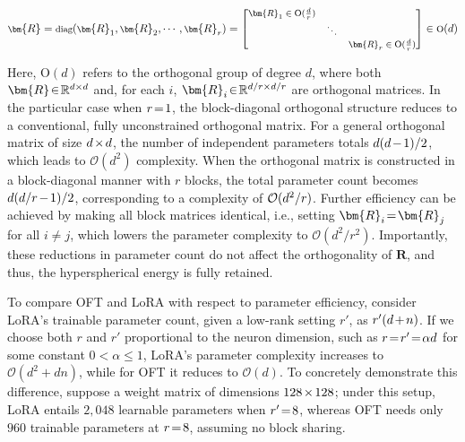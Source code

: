 \begin{equation}
    \footnotesize
    \bm{R}=\text{diag}(\bm{R}_1,\bm{R}_2,\cdots,\bm{R}_r)=\begin{bmatrix}
    \bm{R}_1\in \text{O}(\frac{d}{r}) &  &\\
    &\ddots & \\
    & & \bm{R}_r\in \text{O}(\frac{d}{r})
    \end{bmatrix}\in \text{O}(d)
\end{equation}

Here, $\text{O}(d)$ refers to the orthogonal group of degree $d$, where both $\thickmuskip=2mu \medmuskip=2mu \bm{R}\in\mathbb{R}^{d\times d}$ and, for each $i$, $\thickmuskip=2mu \medmuskip=2mu \bm{R}_i\in\mathbb{R}^{d/r\times d/r}$ are orthogonal matrices. In the particular case when $\thickmuskip=2mu \medmuskip=2mu r=1$, the block-diagonal orthogonal structure reduces to a conventional, fully unconstrained orthogonal matrix. For a general orthogonal matrix of size $\thickmuskip=2mu \medmuskip=2mu d\times d$, the number of independent parameters totals $\thickmuskip=2mu \medmuskip=2mu d(d-1)/2$, which leads to $\mathcal{O}(d^2)$ complexity. When the orthogonal matrix is constructed in a block-diagonal manner with $r$ blocks, the total parameter count becomes $\thickmuskip=2mu \medmuskip=2mu d(d/r-1)/2$, corresponding to a complexity of $\thickmuskip=2mu \medmuskip=2mu \mathcal{O}(d^2/r)$. Further efficiency can be achieved by making all block matrices identical, i.e., setting $\thickmuskip=2mu \medmuskip=2mu\bm{R}_i=\bm{R}_j$ for all $i\neq j$, which lowers the parameter complexity to $\mathcal{O}(d^2/r^2)$. Importantly, these reductions in parameter count do not affect the orthogonality of $\bm{R}$, and thus, the hyperspherical energy is fully retained.

To compare OFT and LoRA with respect to parameter efficiency, consider LoRA’s trainable parameter count, given a low-rank setting $r'$, as $\thickmuskip=2mu \medmuskip=2mu r'(d+n)$. If we choose both $r$ and $r'$ proportional to the neuron dimension, such as $\thickmuskip=2mu \medmuskip=2mu r=r'=\alpha d$ for some constant $0<\alpha\leq 1$, LoRA’s parameter complexity increases to $\mathcal{O}(d^2+dn)$, while for OFT it reduces to $\mathcal{O}(d)$. To concretely demonstrate this difference, suppose a weight matrix of dimensions $\thickmuskip=2mu \medmuskip=2mu 128\times 128$; under this setup, LoRA entails $2,048$ learnable parameters when $\thickmuskip=2mu \medmuskip=2mu r'=8$, whereas OFT needs only $960$ trainable parameters at $\thickmuskip=2mu \medmuskip=2mu r=8$, assuming no block sharing.

